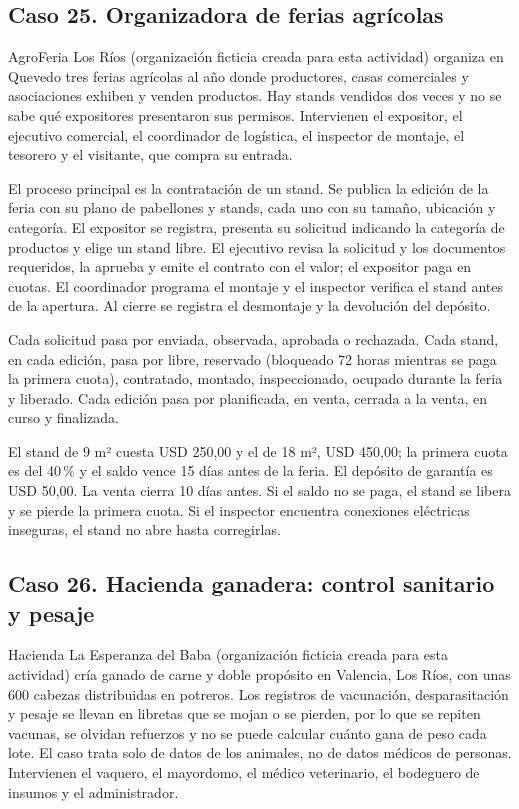 \documentclass[11pt]{article}
\newcommand{\subseccion}[1]{\subsection{\textcolor{midblue}{#1}}}
\begin{document}
\subseccion{Caso 25. Organizadora de ferias agrícolas}
AgroFeria Los Ríos (organización ficticia creada para esta actividad) organiza en Quevedo tres ferias agrícolas al año donde productores, casas comerciales y asociaciones exhiben y venden productos. Hay stands vendidos dos veces y no se sabe qué expositores presentaron sus permisos. Intervienen el expositor, el ejecutivo comercial, el coordinador de logística, el inspector de montaje, el tesorero y el visitante, que compra su entrada.

El proceso principal es la contratación de un stand. Se publica la edición de la feria con su plano de pabellones y stands, cada uno con su tamaño, ubicación y categoría. El expositor se registra, presenta su solicitud indicando la categoría de productos y elige un stand libre. El ejecutivo revisa la solicitud y los documentos requeridos, la aprueba y emite el contrato con el valor; el expositor paga en cuotas. El coordinador programa el montaje y el inspector verifica el stand antes de la apertura. Al cierre se registra el desmontaje y la devolución del depósito.

Cada solicitud pasa por enviada, observada, aprobada o rechazada. Cada stand, en cada edición, pasa por libre, reservado (bloqueado 72 horas mientras se paga la primera cuota), contratado, montado, inspeccionado, ocupado durante la feria y liberado. Cada edición pasa por planificada, en venta, cerrada a la venta, en curso y finalizada.

El stand de 9 m² cuesta USD 250,00 y el de 18 m², USD 450,00; la primera cuota es del 40\,\% y el saldo vence 15 días antes de la feria. El depósito de garantía es USD 50,00. La venta cierra 10 días antes. Si el saldo no se paga, el stand se libera y se pierde la primera cuota. Si el inspector encuentra conexiones eléctricas inseguras, el stand no abre hasta corregirlas.

\subseccion{Caso 26. Hacienda ganadera: control sanitario y pesaje}
Hacienda La Esperanza del Baba (organización ficticia creada para esta actividad) cría ganado de carne y doble propósito en Valencia, Los Ríos, con unas 600 cabezas distribuidas en potreros. Los registros de vacunación, desparasitación y pesaje se llevan en libretas que se mojan o se pierden, por lo que se repiten vacunas, se olvidan refuerzos y no se puede calcular cuánto gana de peso cada lote. El caso trata solo de datos de los animales, no de datos médicos de personas. Intervienen el vaquero, el mayordomo, el médico veterinario, el bodeguero de insumos y el administrador.
\end{document}
